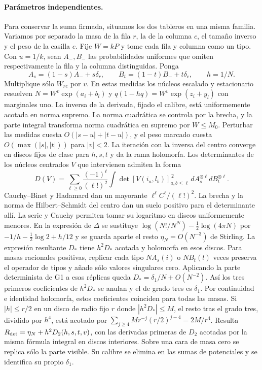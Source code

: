 \paragraph{Parámetros independientes.}
Para conservar la suma firmada, situamos los dos tableros en una misma familia. Variamos por
separado la masa de la fila $r$, la de la columna $c$, el tamaño inverso y el peso de la casilla
$e$. Fije $W=kP$ y tome cada fila y columna como un tipo. Con $u=1/k$, sean $A_-,B_-$ las
probabilidades uniformes que omiten respectivamente la fila y la columna distinguidas. Ponga
\[
  A_s=(1-s)A_-+s\delta_r,\qquad B_t=(1-t)B_-+t\delta_c,\qquad h=1/N .
\]
Multiplique sólo $W_{rc}$ por $v$. En estas medidas los núcleos escalado y estacionario resuelven
$N=W^v\exp(a_i+b_l)$ y $q(1-hq)=W^v\exp(z_i+y_l)$ con marginales uno.
La inversa de la derivada, fijado el calibre, está uniformemente acotada en norma supremo.
La norma cuadrática se controla por la brecha, y la parte integral transforma norma cuadrática
en supremo por $W\le M_0$. Perturbar las medidas cuesta $O(|s-u|+|t-u|)$, y el peso
marcado cuesta $O(\max(|s|,|t|))$ para $|v|<2$. La iteración con la inversa del centro
converge en discos fijos de clase para $h,s,t$ y da la rama holomorfa.
Los determinantes de los núcleos centrados $V$ que intervienen admiten la forma
\[
 D(V)=\sum_{\ell\ge0}\frac{(-1)^\ell}{(\ell!)^2}
  \int\det[V(i_a,l_b)]_{a,b\le\ell}^{\,2}\,
               dA_s^{\otimes\ell}dB_t^{\otimes\ell}.
\]
Cauchy--Binet y Hadamard dan un mayorante $\ell^\ell C^\ell/(\ell!)^2$. La brecha y la
norma de Hilbert--Schmidt del centro dan un suelo positivo para el determinante allí.
La serie y Cauchy permiten tomar su logaritmo en discos uniformemente menores. En la expresión
de $\Delta$ se sustituye $\log(N!/N^N)-\frac12\log(4\pi N)$ por
$-1/h-\frac12\log2+h/12$ y se guarda aparte el resto $\eta_N=O(N^{-3})$ de Stirling.
La expresión resultante $D_*$ tiene $h^2D_*$ acotada y holomorfa en esos discos.
Para masas racionales positivas, replicar cada tipo $N A_s(i)$ o $N B_t(l)$ veces
preserva el operador de tipos y añade sólo valores singulares cero. Aplicando la parte
determinista de G1 a esas réplicas queda $D_*=\delta_1/N+O(N^{-2})$. Así los tres primeros
coeficientes de $h^2D_*$ se anulan y el de grado tres es $\delta_1$. Por continuidad e identidad
holomorfa, estos coeficientes coinciden para todas las masas. Si $|h|\le r/2$ en un disco
de radio fijo $r$ donde $|h^2D_*|\le M$, el resto tras el grado tres, dividido por $h^4$,
está acotado por $\sum_{j\ge4}Mr^{-j}(r/2)^{j-4}=2M/r^4$. Resulta
$R_{\rm det}=\eta_N+h^2D_2(h,s,t,v)$, con las derivadas primeras de $D_2$ acotadas por
la misma fórmula integral en discos interiores.
Sobre una cara de masa cero se replica sólo la parte visible.
Su calibre se elimina en las sumas de potenciales y se identifica su propio $\delta_1$.

